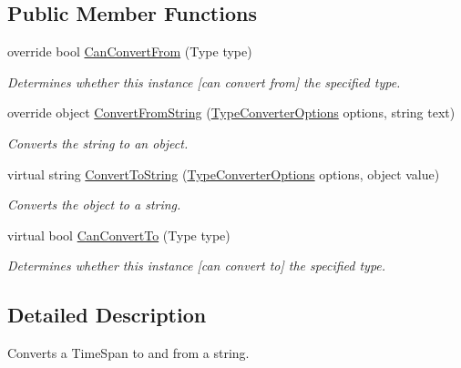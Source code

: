 \subsection*{Public Member Functions}
\begin{DoxyCompactItemize}
\item 
override bool \hyperlink{a00146_ae3f8d46f5176d2ae08ac3fcdda1951e7}{Can\-Convert\-From} (Type type)
\begin{DoxyCompactList}\small\item\em Determines whether this instance \mbox{[}can convert from\mbox{]} the specified type. \end{DoxyCompactList}\item 
override object \hyperlink{a00146_a0f2536c88227a94822d0b7730eedf3eb}{Convert\-From\-String} (\hyperlink{a00152}{Type\-Converter\-Options} options, string text)
\begin{DoxyCompactList}\small\item\em Converts the string to an object. \end{DoxyCompactList}\item 
virtual string \hyperlink{a00066_a36cb2f9b24f15a671293f3a722324c27}{Convert\-To\-String} (\hyperlink{a00152}{Type\-Converter\-Options} options, object value)
\begin{DoxyCompactList}\small\item\em Converts the object to a string. \end{DoxyCompactList}\item 
virtual bool \hyperlink{a00066_acb65bd8c8199d88d5b1629ae35d18514}{Can\-Convert\-To} (Type type)
\begin{DoxyCompactList}\small\item\em Determines whether this instance \mbox{[}can convert to\mbox{]} the specified type. \end{DoxyCompactList}\end{DoxyCompactItemize}


\subsection{Detailed Description}
Converts a Time\-Span to and from a string. 



